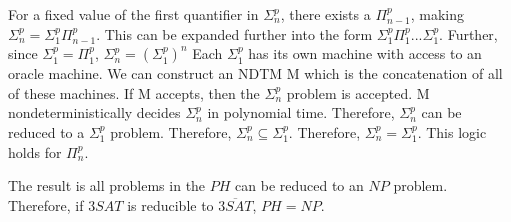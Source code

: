 \documentclass{article}
\begin{document}
For a fixed value of the first quantifier in $\Sigma_{n}^{p}$, there exists a $\Pi_{n-1}^{p}$, making $\Sigma_{n}^{p} = \Sigma_{1}^{p} \Pi_{n-1}^{p}$.  This can be expanded further into the form $\Sigma_{1}^{p}$$\Pi_{1}^{p}$...$\Sigma_{1}^{p}$.  Further, since $\Sigma_{1}^{p} = \Pi_{1}^{p}$, $\Sigma_{n}^{p} = (\Sigma_{1}^{p})^{n}$  Each $\Sigma_{1}^{p}$ has its own machine with access to an oracle machine.  We can construct an NDTM M which is the concatenation of all of these machines.  If M accepts, then the $\Sigma_{n}^{p}$ problem is accepted.  M nondeterministically decides $\Sigma_{n}^{p}$ in polynomial time.  Therefore, $\Sigma_{n}^{p}$ can be reduced to a $\Sigma_{1}^{p}$ problem.  Therefore, $\Sigma_{n}^{p} \subseteq \Sigma_{1}^{p}$. Therefore, $\Sigma_{n}^{p} = \Sigma_{1}^{p}$.  This logic holds for $\Pi_{n}^{p}$.

The result is all problems in the $PH$ can be reduced to an $NP$ problem.  Therefore, if $3SAT$ is reducible to $\overline{3SAT}$, $PH=NP$.
\end{document}
